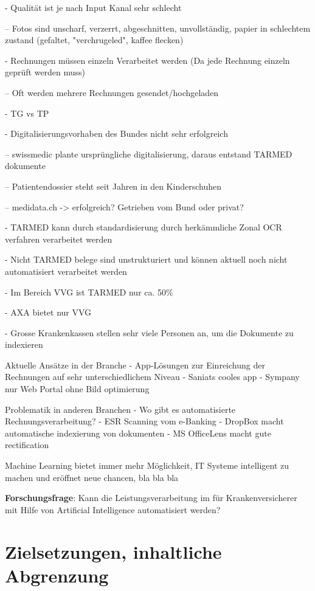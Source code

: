 \documentclass[12pt]{extarticle}
\begin{document}
- Qualität ist je nach Input Kanal sehr schlecht

  -- Fotos sind unscharf, verzerrt, abgeschnitten, unvollständig, papier in schlechtem zustand (gefaltet, "verchrugeled", kaffee flecken)

- Rechnungen müssen einzeln Verarbeitet werden (Da jede Rechnung einzeln geprüft werden muss)

  -- Oft werden mehrere Rechnungen gesendet/hochgeladen

- TG vs TP

- Digitalisierungsvorhaben des Bundes nicht sehr erfolgreich

  -- swissmedic plante ursprüngliche digitalisierung, daraus entstand TARMED dokumente

  -- Patientendossier steht seit Jahren in den Kinderschuhen

  -- medidata.ch -> erfolgreich? Getrieben vom Bund oder privat?

- TARMED kann durch standardisierung durch herkämmliche Zonal OCR verfahren verarbeitet werden

- Nicht TARMED belege sind unstrukturiert und können aktuell noch nicht automatisiert verarbeitet werden

- Im Bereich VVG ist TARMED nur ca. 50\%

- AXA bietet nur VVG

- Grosse Krankenkassen stellen sehr viele Personen an, um die Dokumente zu indexieren

Aktuelle Ansätze in der Branche
- App-Lösungen zur Einreichung der Rechnungen auf sehr unterschiedlichem Niveau
  - Saniats cooles app
  - Sympany nur Web Portal ohne Bild optimierung

Problematik in anderen Branchen
- Wo gibt es automatisierte Rechnungsverarbeitung?
- ESR Scanning vom e-Banking
- DropBox macht automatische indexierung von dokumenten
- MS OfficeLens macht gute rectification

Machine Learning bietet immer mehr Möglichkeit, IT Systeme intelligent zu machen und eröffnet neue chancen, bla bla bla

\textbf{Forschungsfrage}: Kann die Leistungsverarbeitung im für Krankenversicherer mit Hilfe von Artificial Intelligence automatisiert werden?

\section{Zielsetzungen, inhaltliche Abgrenzung}
\end{document}
